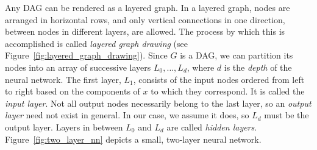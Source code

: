 \documentclass[11pt,a4paper]{article}
\numberwithin{equation}{section}
\begin{document}
Any DAG can be rendered as a layered graph. In a layered graph, nodes are
arranged in horizontal rows, and only vertical connections in one direction,
between nodes in different layers, are allowed. The process by which this is
accomplished is called \emph{layered graph drawing} (see
Figure~\ref{fig:layered_graph_drawing}). Since $G$ is a DAG, we can partition
its nodes into an array of successive layers $L_0, \ldots, L_d$, where $d$ is
the \emph{depth} of the neural network. The first layer, $L_1$, consists of the
input nodes ordered from left to right based on the components of $x$ to which
they correspond. It is called the \emph{input layer}. Not all output nodes
necessarily belong to the last layer, so an \emph{output layer} need not exist
in general. In our case, we assume it does, so $L_d$ must be the output layer.
Layers in between $L_0$ and $L_d$ are called \emph{hidden layers}.
Figure~\ref{fig:two_layer_nn} depicts a small, two-layer neural network.
\end{document}
